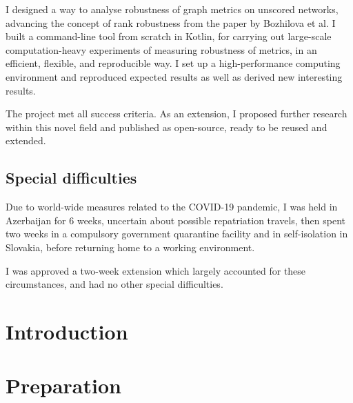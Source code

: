 \documentclass[12pt,a4paper,twoside,openany]{report}
\begin{document}
    I designed a way to analyse robustness of graph metrics on unscored networks, advancing the concept of rank robustness from the paper by Bozhilova et al.
    I built a command-line tool \graffs from scratch in Kotlin, for carrying out large-scale computation-heavy experiments of measuring robustness of metrics, in an efficient, flexible, and reproducible way.
    I set up a high-performance computing environment and reproduced expected results as well as derived new interesting results.

    The project met all success criteria.
    As an extension, I proposed further research within this novel field and published \graffs as open-source, ready to be reused and extended.


    \section*{Special difficulties}

    Due to world-wide measures related to the COVID-19 pandemic, I was held in Azerbaijan for 6 weeks, uncertain about possible repatriation travels, then spent two weeks in a compulsory government quarantine facility and in self-isolation in Slovakia, before returning home to a working environment.

    I was approved a two-week extension which largely accounted for these circumstances, and had no other special difficulties.


    \tableofcontents
    \clearpage



    \pagestyle{headings}

%    

    \chapter{Introduction}\label{ch:introduction}
    


    \chapter{Preparation}\label{ch:preparation}
    
\end{document}
